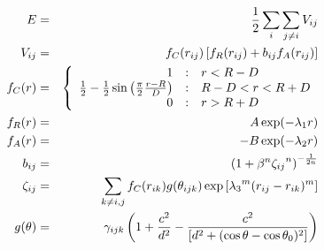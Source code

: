 \documentclass[12pt]{article}
\begin{document}
\begin{eqnarray*}
  E & = & \frac{1}{2} \sum_i \sum_{j \neq i} V_{ij} \\
  V_{ij} & = & f_C(r_{ij}) \left[ f_R(r_{ij}) + b_{ij} f_A(r_{ij}) \right] \\
  f_C(r) & = & \left\{ \begin{array} {r@{\quad:\quad}l}
    1 & r < R - D \\
    \frac{1}{2} - \frac{1}{2} \sin \left( \frac{\pi}{2} \frac{r-R}{D} \right) &
      R-D < r < R + D \\
    0 & r > R + D
    \end{array} \right. \\
  f_R(r) & = & A \exp (-\lambda_1 r) \\
  f_A(r) & = & -B \exp (-\lambda_2 r) \\
  b_{ij} & = & \left( 1 + \beta^n {\zeta_{ij}}^n \right)^{-\frac{1}{2n}} \\
  \zeta_{ij} & = & \sum_{k \neq i,j} f_C(r_{ik}) g(\theta_{ijk})
                   \exp \left[ {\lambda_3}^m (r_{ij} - r_{ik})^m \right] \\
  g(\theta) & = & \gamma_{ijk} \left( 1 + \frac{c^2}{d^2} - 
                  \frac{c^2}{\left[ d^2 + 
		  (\cos \theta - \cos \theta_0)^2\right]} \right)
\end{eqnarray*}
\end{document}
